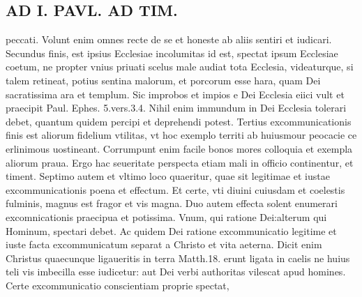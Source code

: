 \documentclass{article}
\begin{document}
\begin{pages}
\section*{AD I. PAVL. AD TIM. }
\marginpar{[ p.403 ]}\pstart peccati. Volunt enim omnes recte de se et honeste ab aliis sentiri et iudicari.  \pend\pstart Secundus finis, est ipsius Ecclesiae incolumitas id est, spectat ipsum Ecclesiae coetum, ne propter vnius priuati scelus male audiat tota Ecclesia, videaturque, si talem retineat, potius sentina malorum, et porcorum esse hara, quam Dei sacratissima ara et templum. Sic improbos et impios e Dei Ecclesia eiici vult et praecipit Paul. Ephes. 5.vers.3.4. Nihil enim immundum in Dei Ecclesia tolerari debet, quantum quidem percipi et deprehendi potest.  \pend\pstart Tertius excommunicationis finis est aliorum fidelium vtilitas, vt hoc exemplo territi ab huiusmour peocacie ce erlinimous uostineant. Corrumpunt enim facile bonos mores colloquia et exempla aliorum praua. Ergo hac seueritate perspecta etiam mali in officio continentur, et timent.  \pend\pstart Septimo autem et vltimo loco quaeritur, quae sit legitimae et iustae excommunicationis poena et effectum. Et certe, vti diuini cuiusdam et coelestis fulminis, magnus est fragor et vis magna. Duo autem effecta solent enumerari excomnicationis praecipua et potissima. Vnum, qui ratione Dei:alterum qui Hominum, spectari debet. Ac quidem Dei ratione excommunicatio legitime et iuste facta excommunicatum separat a Christo et vita aeterna. Dicit enim Christus quaecunque  ligaueritis in terra Matth.18. erunt ligata in caelis ne huius teli vis imbecilla esse iudicetur: aut Dei verbi authoritas vilescat apud homines. Certe excommunicatio conscientiam proprie spectat,  \pend

\end{pages}
\end{document}
